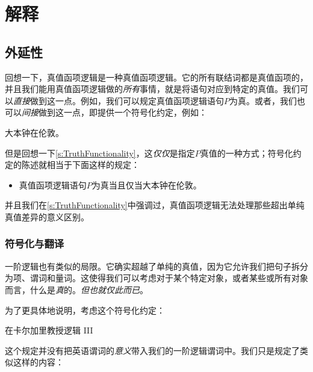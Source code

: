 \part{解释}
\label{ch.semantics}

\chapter{外延性}\label{s:Interpretations}

回想一下，真值函项逻辑是一种真值函项逻辑。它的所有联结词都是真值函项的，并且我们能用真值函项逻辑做的\emph{所有}事情，就是将语句对应到特定的真值。我们可以\emph{直接}做到这一点。例如，我们可以规定真值函项逻辑语句$P$为真。或者，我们也可以\emph{间接}做到这一点，即提供一个符号化约定，例如：


\begin{ekey}
		\item[P] 大本钟在伦敦。
	\end{ekey}


但是回想一下\cref{s:TruthFunctionality}，这\emph{仅仅}是指定$P$真值的一种方式；符号化约定的陈述就相当于下面这样的规定：


\begin{itemize}
		\item 真值函项逻辑语句$P$为真当且仅当大本钟在伦敦。
	\end{itemize}


并且我们在\cref{s:TruthFunctionality}中强调过，真值函项逻辑无法处理那些超出单纯真值差异的意义区别。

\section{符号化与翻译}

一阶逻辑也有类似的局限。它确实超越了单纯的真值，因为它允许我们把句子拆分为项、谓词和量词。这使得我们可以考虑对于某个特定对象，或者某些或所有对象而言，什么是\emph{真}的。\emph{但也就仅此而已}。

为了更具体地说明，考虑这个符号化约定：


\begin{ekey}
		\item[\atom{C}{x}]  在卡尔加里教授逻辑 III
	\end{ekey}


这个规定并没有把英语谓词的\emph{意义}带入我们的一阶逻辑谓词中。我们只是规定了类似这样的内容：


